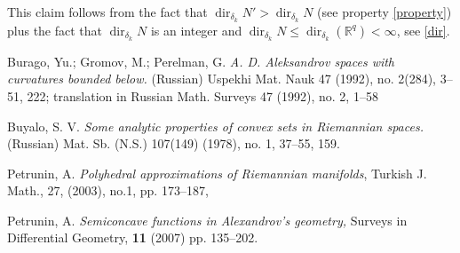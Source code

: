 \documentclass{article}
\def\RR{\mathbb{R}}
\def\le{\leqslant}
\def\dir{\operatorname{dir}}
\begin{document}
This claim follows from the fact that $\dir_{\delta_k} N'>\dir_{\delta_k} N$ (see property \ref{property}) plus the fact that $\dir_{\delta_k} N$ is an integer and $\dir_{\delta_k} N\le \dir_{\delta_k}(\RR^q)<\infty$, see \ref{dir}.

\begin{thebibliography}{References}

Burago, Yu.; Gromov, M.; Perelman, G. \textit{A. D. Aleksandrov spaces
with curvatures bounded below.} (Russian)  Uspekhi Mat. Nauk  47  (1992),  no.
2(284), 3--51, 222;  translation in  Russian Math. Surveys  47  (1992),  no. 2,
1--58

 Buyalo, S. V. \textit{Some analytic properties of convex sets in Riemannian spaces.} (Russian)  Mat. Sb. (N.S.)  107(149)  (1978), no. 1, 37--55, 159.

 Petrunin, A.  \textit{Polyhedral approximations of Riemannian manifolds}, {Turkish J. Math.}, {27}, ({2003}), no.{1}, pp. {173--187},

  Petrunin, A. \textit{Semiconcave functions in Alexandrov's geometry,} {Surveys in Differential Geometry}, \textbf{11} (2007) pp. 135--202.

\end{thebibliography}
\end{document}
